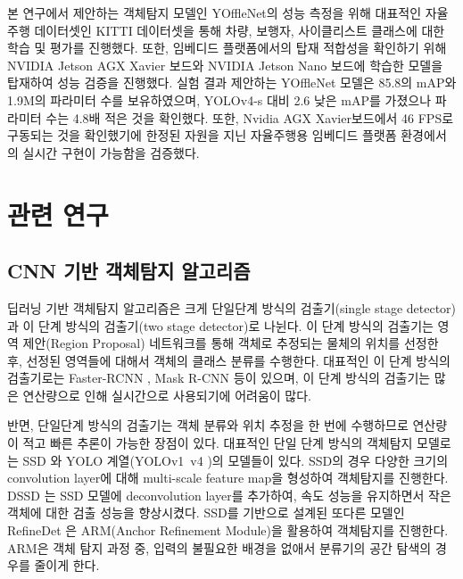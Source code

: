 \documentclass[10pt,twocolumn,letterpaper]{article}
\begin{document}
본 연구에서 제안하는 객체탐지 모델인 YOffleNet의 성능 측정을 위해 대표적인 자율주행 데이터셋인 KITTI 데이터셋을 통해 차량, 보행자, 사이클리스트 클래스에 대한 학습 및 평가를 진행했다. 또한, 임베디드 플랫폼에서의 탑재 적합성을 확인하기 위해 NVIDIA Jetson AGX Xavier 보드와 NVIDIA Jetson Nano 보드에 학습한 모델을 탑재하여 성능 검증을 진행했다. 실험 결과 제안하는 YOffleNet 모델은 85.8의 mAP와 1.9M의 파라미터 수를 보유하였으며, YOLOv4-s 대비 2.6 낮은 mAP를 가졌으나 파라미터 수는 4.8배 적은 것을 확인했다. 또한, Nvidia AGX Xavier보드에서 46 FPS로 구동되는 것을 확인했기에 한정된 자원을 지닌 자율주행용 임베디드 플랫폼 환경에서의 실시간 구현이 가능함을 검증했다.


\vspace{.25cm}
\section{관련 연구}
\vspace{.25cm}

\subsection{CNN 기반 객체탐지 알고리즘}
딥러닝 기반 객체탐지 알고리즘은 크게 단일단계 방식의 검출기(single stage detector)과 이 단계 방식의 검출기(two stage detector)로 나뉜다. 이 단계 방식의 검출기는 영역 제안(Region Proposal) 네트워크를 통해 객체로 추정되는 물체의 위치를 선정한 후, 선정된 영역들에 대해서 객체의 클래스 분류를 수행한다. 대표적인 이 단계 방식의 검출기로는 Faster-RCNN \cite{ren2015faster}, Mask R-CNN \cite{he2017mask} 등이 있으며, 이 단계 방식의 검출기는 많은 연산량으로 인해 실시간으로 사용되기에 어려움이 많다.

반면, 단일단계 방식의 검출기는 객체 분류와 위치 추정을 한 번에 수행하므로 연산량이 적고 빠른 추론이 가능한 장점이 있다. 대표적인 단일 단계 방식의 객체탐지 모델로는 SSD \cite{liu2016ssd}와 YOLO 계열(YOLOv1~v4 \cite{redmon2016you, redmon2017yolo9000, redmon2018yolov3, bochkovskiy2020yolov4})의 모델들이 있다. SSD의 경우 다양한 크기의 convolution layer에 대해 multi-scale feature map을 형성하여 객체탐지를 진행한다. DSSD \cite{fu2017dssd}는 SSD 모델에 deconvolution layer를 추가하여, 속도 성능을 유지하면서 작은 객체에 대한 검출 성능을 향상시켰다. SSD를 기반으로 설계된 또다른 모델인 RefineDet \cite{zhang2018single}은 ARM(Anchor Refinement Module)을 활용하여 객체탐지를 진행한다. ARM은 객체 탐지 과정 중, 입력의 불필요한 배경을 없애서 분류기의 공간 탐색의 경우를 줄이게 한다.
\end{document}
